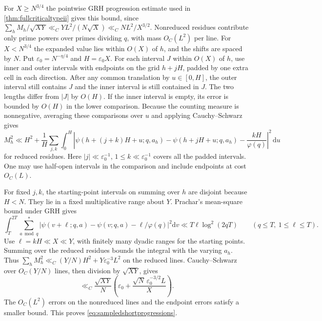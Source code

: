 \documentclass[11pt,a4paper]{article}
\numberwithin{equation}{section}
\newcommand{\ud}{\mathrm d}
\begin{document}
For $X\ge N^{3/4}$ the pointwise GRH progression estimate
used in \cref{thm:fullcriticaltypeii} gives this bound,
since $\sum_h M_h/\sqrt{XY}\ll_C
 YL^2/(N\sqrt X)\ll_C NL^2/X^{3/2}$.
Nonreduced residues contribute only prime powers over
primes dividing $q$, with mass $O_C(L^2)$ per line.
For $X<N^{3/4}$ the expanded value lies within $O(X)$
of $h$, and the shifts are spaced by $N$. Put
$\varepsilon_0=N^{-\eta/4}$ and $H=\varepsilon_0 X$.
For each interval $J$ within $O(X)$ of $h$, use inner
and outer intervals with endpoints on the grid
$h+jH$, padded by one extra cell in each direction.
After any common translation by $u\in[0,H]$, the outer
interval still contains $J$ and the inner interval is
still contained in $J$. The two lengths differ from
$|J|$ by $O(H)$. If the inner interval is empty, its
error is bounded by $O(H)$ in the lower comparison.
Because the counting measure is nonnegative, averaging
these comparisons over $u$ and applying Cauchy--Schwarz
gives
\[
 M_h^2\ll H^2+
 \frac1H\sum_{j,k}\int_0^H
 \left|\psi(h+(j+k)H+u;q,a_h)
       -\psi(h+jH+u;q,a_h)-\frac{kH}{\varphi(q)}\right|^2
       \,\ud u
\]
for reduced residues. Here $|j|\ll \varepsilon_0^{-1}$,
$1\le k\ll \varepsilon_0^{-1}$ covers all the padded
intervals. One may use half-open intervals in the
comparison and include endpoints at cost $O_C(L)$.

For fixed $j,k$, the starting-point intervals on summing
over $h$ are disjoint because $H<N$. They lie in a
fixed multiplicative range about $Y$. Prachar's mean-square
bound under GRH \cite{PracharShort,GoldstonYildirimShort}
gives
\[
 \int_T^{2T}\sum_{a\bmod q}^{*}
 \left|\psi(v+\ell;q,a)-\psi(v;q,a)-\ell/\varphi(q)\right|^2
        \ud v\ll T\ell\log^2(2qT)
         \qquad (q\le T,\ 1\le\ell\le T).
\]
Use $\ell=kH\ll X\ll Y$, with finitely many dyadic ranges
for the starting points. Summing over the reduced residues
bounds the integral with the varying $a_h$. Thus
$\sum_h M_h^2\ll_C (Y/N)H^2+Y\varepsilon_0^{-3}L^2$
on the reduced lines. Cauchy--Schwarz over $O_C(Y/N)$
lines, then division by $\sqrt{XY}$, gives
\[
 \ll_C \frac{\sqrt{XY}}N
          \left(\varepsilon_0+
             \frac{\sqrt N\,\varepsilon_0^{-3/2}L}{X}\right).
\]
The $O_C(L^2)$ errors on the nonreduced lines and the
endpoint errors satisfy a smaller bound. This proves
\cref{eq:sampledshortprogressions}.
\end{document}
